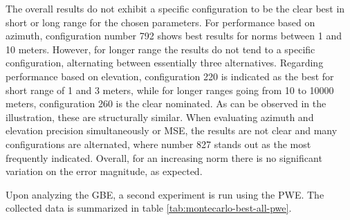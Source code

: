 The overall results do not exhibit a specific configuration to be the clear best in short or long range for the chosen parameters. For performance based on azimuth, configuration number 792 shows best results for norms between 1 and 10 meters. However, for longer range the results do not tend to a specific configuration, alternating between essentially three alternatives. Regarding performance based on elevation, configuration 220 is indicated as the best for short range of 1 and 3 meters, while for longer ranges going from 10 to 10000 meters, configuration 260 is the clear nominated. As can be observed in the illustration, these are structurally similar. When evaluating azimuth and elevation precision simultaneously or MSE, the results are not clear and many configurations are alternated, where number 827 stands out as the most frequently indicated. Overall, for an increasing norm there is no significant variation on the error magnitude, as expected.

Upon analyzing the GBE, a second experiment is run using the PWE. The collected data is summarized in table \ref{tab:montecarlo-best-all-pwe}.

